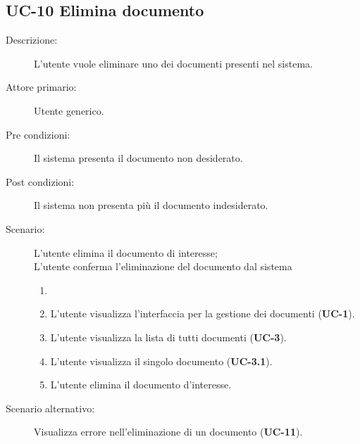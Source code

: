 \subsection{UC-10 Elimina documento}
\begin{description}
    \item[Descrizione:] L'utente vuole eliminare uno dei documenti presenti nel sistema.
    \item[Attore primario:] Utente generico.
    \item[Pre condizioni:] Il sistema presenta il documento non desiderato.
    \item[Post condizioni:] Il sistema non presenta più il documento indesiderato.
    \item[Scenario:] L'utente elimina il documento di interesse;\\L'utente conferma l'eliminazione del documento dal sistema
    \begin{enumerate}
        \item[] 
        \item L’utente visualizza l'interfaccia per la gestione dei documenti (\textbf{UC-1}).
        \item L’utente visualizza la lista di tutti documenti (\textbf{UC-3}).
        \item L'utente visualizza il singolo documento (\textbf{UC-3.1}).
        \item L'utente elimina il documento d'interesse.
    \end{enumerate} 
    \item[Scenario alternativo:] Visualizza errore nell'eliminazione di un documento (\textbf{UC-11}).
\end{description}

